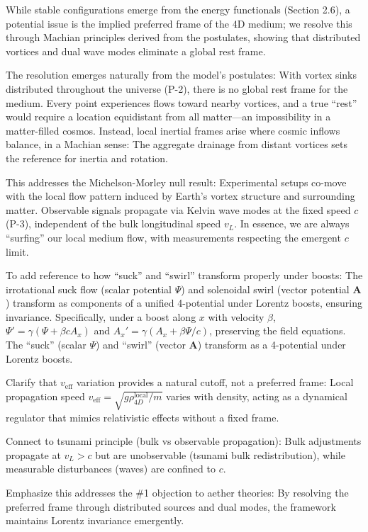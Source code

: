 While stable configurations emerge from the energy functionals (Section 2.6), a potential issue is the implied preferred frame of the 4D medium; we resolve this through Machian principles derived from the postulates, showing that distributed vortices and dual wave modes eliminate a global rest frame.

The resolution emerges naturally from the model's postulates: With vortex sinks distributed throughout the universe (P-2), there is no global rest frame for the medium. Every point experiences flows toward nearby vortices, and a true ``rest'' would require a location equidistant from all matter---an impossibility in a matter-filled cosmos. Instead, local inertial frames arise where cosmic inflows balance, in a Machian sense: The aggregate drainage from distant vortices sets the reference for inertia and rotation.

This addresses the Michelson-Morley null result: Experimental setups co-move with the local flow pattern induced by Earth's vortex structure and surrounding matter. Observable signals propagate via Kelvin wave modes at the fixed speed $c$ (P-3), independent of the bulk longitudinal speed $v_L$. In essence, we are always ``surfing'' our local medium flow, with measurements respecting the emergent $c$ limit.

To add reference to how ``suck'' and ``swirl'' transform properly under boosts: The irrotational suck flow (scalar potential $\Psi$) and solenoidal swirl (vector potential $\mathbf{A}$) transform as components of a unified 4-potential under Lorentz boosts, ensuring invariance. Specifically, under a boost along $x$ with velocity $\beta$, $\Psi' = \gamma (\Psi + \beta c A_x)$ and $A_x' = \gamma (A_x + \beta \Psi / c)$, preserving the field equations. The ``suck'' (scalar $\Psi$) and ``swirl'' (vector $\mathbf{A}$) transform as a 4-potential under Lorentz boosts.

Clarify that $v_{\text{eff}}$ variation provides a natural cutoff, not a preferred frame: Local propagation speed $v_{\text{eff}} = \sqrt{g \rho_{4D}^{\text{local}} / m}$ varies with density, acting as a dynamical regulator that mimics relativistic effects without a fixed frame.

Connect to tsunami principle (bulk vs observable propagation): Bulk adjustments propagate at $v_L > c$ but are unobservable (tsunami bulk redistribution), while measurable disturbances (waves) are confined to $c$.

Emphasize this addresses the \#1 objection to aether theories: By resolving the preferred frame through distributed sources and dual modes, the framework maintains Lorentz invariance emergently.

